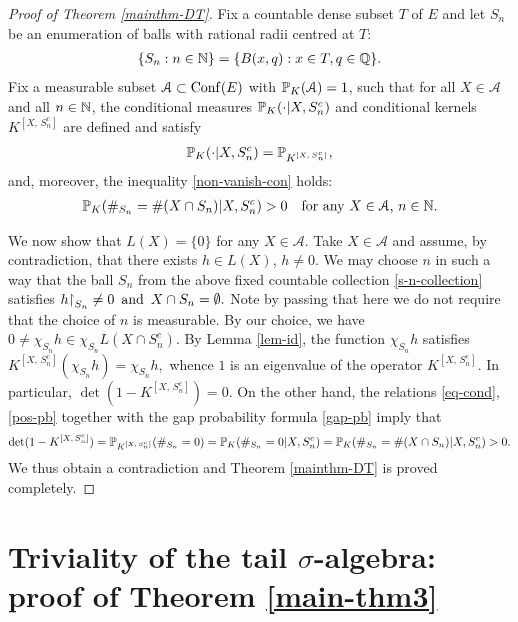 \documentclass[12pt]{paper}
\numberwithin{theorem}{section}
\numberwithin{figure}{section}
\numberwithin{equation}{section}
\begin{document}
\begin{proof}[Proof of Theorem \ref{mainthm-DT}]
Fix a countable dense subset $T$ of $E$  and let $S_n$ be an enumeration of balls with rational radii centred at $T$:
\begin{align}\label{s-n-collection}
\{S_n: n \in \mathbb{N}\} = \{B(x, q): x\in T, q \in \mathbb{Q}\}.
\end{align}
Fix a measurable subset $\mathcal{A} \subset \mathrm{Conf}(E)$ with $\mathbb{P}_K(\mathcal{A}) = 1$,
such that for all $X \in \mathcal{A}$ and all $n\in \mathbb{N}$,  the conditional measures $\mathbb{P}_K(\cdot| X, S_n^c)$ and conditional kernels $K^{[X, \, S_n^c]}$ are defined and satisfy
\begin{align}\label{eq-cond}
\mathbb{P}_K(\cdot| X, S_n^c)  = \mathbb{P}_{K^{[X, \, S_n^c]}},
\end{align}
and, moreover, the inequality \eqref{non-vanish-con} holds:
\begin{align}\label{pos-pb}
\mathbb{P}_K(\#_{S_n} = \#(X \cap S_n) | X, S_n^c) >0 \quad \text{for any $X\in \mathcal{A}$, $n\in\mathbb{N}$.}
\end{align}

We now show that $L(X) = \{0\}$ for any $X \in \mathcal{A}$.
Take $X \in \mathcal{A}$ and assume, by contradiction, that there exists $h\in L(X)$, $h \ne 0$.  We may choose $n$ in such a way that the ball $S_n$ from the above fixed countable collection \eqref{s-n-collection} satisfies
$
h\mathord{\upharpoonright}_{S_n} \ne  0 \text{\, and \,}  X \cap S_n = \emptyset.
$
Note by passing that here we do not require that the choice of $n$ is measurable.  By our choice, we have $
0 \ne \chi_{S_n} h \in \chi_{S_n} L(X\cap S_n^c).
$
By Lemma \ref{lem-id}, the function  $\chi_{S_n} h$ satisfies
$
K^{[X, \, S_n^c]}(\chi_{S_n} h) = \chi_{S_n} h,
$
 whence  $1$ is an eigenvalue of the operator $K^{[X, \, S_n^c]}$. In particular,
$
\det(1 - K^{[X, \, S_n^c]}) =0.
$
On the other hand, the relations \eqref{eq-cond}, \eqref{pos-pb} together with the gap probability formula \eqref{gap-pb} imply that
\[
 \det (1 - K^{[X, \, S_n^c]})  = \mathbb{P}_{K^{[X, \, S_n^c]}} (\#_{S_n} =0) = \mathbb{P}_K(\#_{S_n} =0 | X, S_n^c)  = \mathbb{P}_K(\#_{S_n} = \#(X \cap S_n) | X, S_n^c)>0.
\]
 We thus obtain a contradiction and Theorem \ref{mainthm-DT} is proved completely.
\end{proof}











\section{Triviality of the  tail $\sigma$-algebra: proof of Theorem \ref{main-thm3}}
\end{document}
